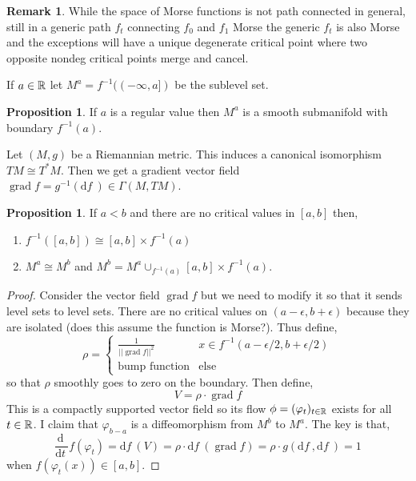 \documentclass[12pt]{extarticle}
\renewcommand{\d}[1]{ \mathrm{d}#1 \:}
\newcommand{\deriv}[2]{\frac{\d{#1}}{\d{#2}}}
\DeclareMathOperator{\grad}{\mathrm{grad}}
\theoremstyle{definition}
\newtheorem{proposition}[theorem]{Proposition}
\newtheorem{remark}{Remark}
\newenvironment{definition}[1][Definition:]{\begin{trivlist}
\item[\hskip \labelsep {\bfseries #1}]}{\end{trivlist}}
\begin{document}
\begin{remark}
While the space of Morse functions is not path connected in general, still in a generic path $f_t$ connecting $f_0$ and $f_1$ Morse the generic $f_t$ is also Morse and the exceptions will have a unique degenerate critical point where two opposite nondeg critical points merge and cancel. 
\end{remark}

\begin{definition}
If $a \in \mathbb{R}$ let $M^a = f^{-1}((-\infty, a])$ be the sublevel set.
\end{definition}

\begin{proposition}
If $a$ is a regular value then $M^a$ is a smooth submanifold with boundary $f^{-1}(a)$.
\end{proposition}


\begin{definition}
Let $(M, g)$ be a Riemannian metric. This induces a canonical isomorphism $TM \cong T^*M$. Then we get a gradient vector field $\grad f = g^{-1}(\d{f}) \in \Gamma(M, TM)$. 
\end{definition}

\begin{proposition}
If $a < b$ and there are no critical values in $[a,b]$ then,
\begin{enumerate}
\item $f^{-1}([a,b]) \cong [a,b] \times f^{-1}(a)$
\item $M^a \cong M^b$ and $M^b = M^a \cup_{f^{-1}(a)} [a,b] \times f^{-1}(a)$. 
\end{enumerate}
\end{proposition}

\begin{proof}
Consider the vector field $\grad f$ but we need to modify it so that it sends level sets to level sets. There are no critical values on $(a - \epsilon, b + \epsilon)$ because they are isolated (does this assume the function is Morse?). Thus define,
\[ \rho = 
\begin{cases}
\frac{1}{|| \grad f ||^2} & x \in f^{-1}(a - \epsilon/2, b + \epsilon/2) 
\\
\text{bump function} & \text{else}
\end{cases} \] 
so that $\rho$ smoothly goes to zero on the boundary. Then define,
\[ V = \rho \cdot \grad f \]
This is a compactly supported vector field so its flow $\phi = (\varphi_t)_{t \in \mathbb{R}}$ exists for all $t \in \mathbb{R}$. I claim that $\varphi_{b-a}$ is a diffeomorphism from $M^b$ to $M^a$. The key is that,
\[ \deriv{}{t} f(\varphi_t) = \d{f}(V) = \rho \cdot \d{f}(\grad f) = \rho \cdot g(\d{f}, \d{f}) = 1 \]
when $f(\varphi_t(x)) \in [a,b]$. 
\end{proof}
\end{document}
